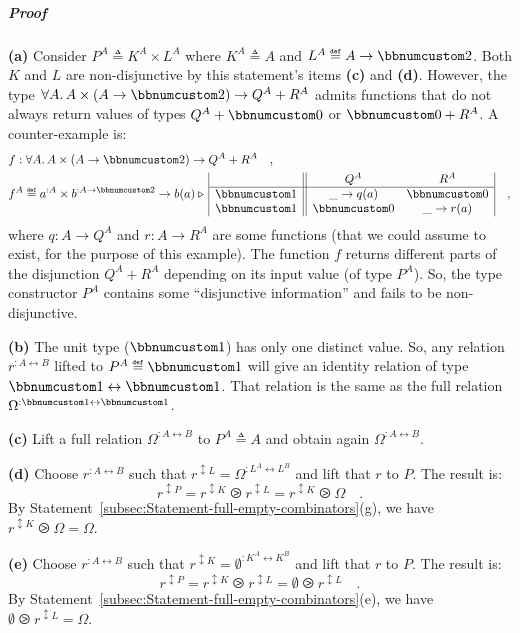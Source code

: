 \subparagraph{Proof}

\textbf{(a)} Consider $P^{A}\triangleq K^{A}\times L^{A}$ where $K^{A}\triangleq A$
and $L^{A}\triangleq A\rightarrow\bbnum 2$. Both $K$ and $L$ are
non-disjunctive by this statement\textsf{'}s items \textbf{(c)} and \textbf{(d)}.
However, the type $\forall A.\,A\times(A\rightarrow\bbnum 2)\rightarrow Q^{A}+R^{A}$
admits functions that do not always return values of types $Q^{A}+\bbnum 0$
or $\bbnum 0+R^{A}$. A counter-example is:
\begin{align*}
 & f:\forall A.\,A\times(A\rightarrow\bbnum 2)\rightarrow Q^{A}+R^{A}\quad,\\
 & f^{A}\triangleq a^{:A}\times b^{:A\rightarrow\bbnum 2}\rightarrow b(a)\triangleright\,\begin{array}{|c||cc|}
 & Q^{A} & R^{A}\\
\hline \bbnum 1 & \_\rightarrow q(a) & \bbnum 0\\
\bbnum 1 & \bbnum 0 & \_\rightarrow r(a)
\end{array}\quad,
\end{align*}
where $q:A\rightarrow Q^{A}$ and $r:A\rightarrow R^{A}$ are some
functions (that we could assume to exist, for the purpose of this
example). The function $f$ returns different parts of the disjunction
$Q^{A}+R^{A}$ depending on its input value (of type $P^{A}$). So,
the type constructor $P^{A}$ contains some \textsf{``}disjunctive information\textsf{''}
and fails to be non-disjunctive.

\textbf{(b)} The unit type ($\bbnum 1$) has only one distinct value.
So, any relation $r^{:A\leftrightarrow B}$ lifted to $P^{A}\triangleq\bbnum 1$
will give an identity relation of type $\bbnum 1\leftrightarrow\bbnum 1$.
That relation is the same as the full relation $\Omega^{:\bbnum 1\leftrightarrow\bbnum 1}$.

\textbf{(c)} Lift a full relation $\Omega^{:A\leftrightarrow B}$
to $P^{A}\triangleq A$ and obtain again $\Omega^{:A\leftrightarrow B}$.

\textbf{(d)} Choose $r^{:A\leftrightarrow B}$ such that $r^{\updownarrow L}=\Omega^{:L^{A}\leftrightarrow L^{B}}$
and lift that $r$ to $P$. The result is:
\[
r^{\updownarrow P}=r^{\updownarrow K}\ogreaterthan r^{\updownarrow L}=r^{\updownarrow K}\ogreaterthan\Omega\quad.
\]
By Statement~\ref{subsec:Statement-full-empty-combinators}(g), we
have $r^{\updownarrow K}\ogreaterthan\Omega=\Omega$.

\textbf{(e)} Choose $r^{:A\leftrightarrow B}$ such that $r^{\updownarrow K}=\emptyset^{:K^{A}\leftrightarrow K^{B}}$
and lift that $r$ to $P$. The result is:
\[
r^{\updownarrow P}=r^{\updownarrow K}\ogreaterthan r^{\updownarrow L}=\emptyset\ogreaterthan r^{\updownarrow L}\quad.
\]
By Statement~\ref{subsec:Statement-full-empty-combinators}(e), we
have $\emptyset\ogreaterthan r^{\updownarrow L}=\Omega$.


